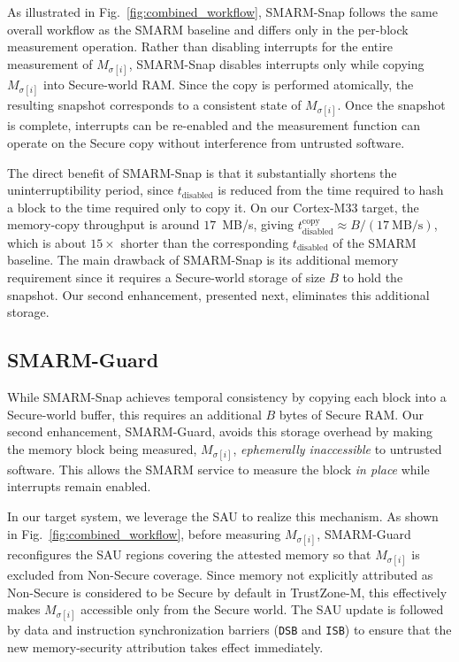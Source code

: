 \documentclass[conference]{IEEEtran}
\newcommand{\tdis}{$t_{\mathrm{disabled}}$\xspace}
\newcommand{\smarmcopy}{SMARM-Snap\xspace}
\newcommand{\smarmlock}{SMARM-Guard\xspace}
\begin{document}
As illustrated in Fig.~\ref{fig:combined_workflow}, \smarmcopy follows the same overall workflow as the SMARM baseline and differs only in the per-block measurement operation. Rather than disabling interrupts for the entire measurement of $M_{\sigma[i]}$, \smarmcopy disables interrupts only while copying $M_{\sigma[i]}$ into Secure-world RAM.
Since the copy is performed atomically, the resulting snapshot corresponds to a consistent state of $M_{\sigma[i]}$.
Once the snapshot is complete, interrupts can be re-enabled and the measurement function can operate on the Secure copy without interference from untrusted software.

The direct benefit of \smarmcopy is that it substantially shortens the uninterruptibility period, since \tdis is reduced from the time required to hash a block to the time required only to copy it. On our Cortex-M33 target, the memory-copy throughput is around $17$~MB/s, giving
$t_{\mathrm{disabled}}^{\mathrm{copy}}\approx B/(17~\mathrm{MB/s})$, which is about $15\times$ shorter than the corresponding \tdis of the SMARM baseline.
%
The main drawback of \smarmcopy is its additional memory requirement since it requires a Secure-world storage of size $B$ to hold the snapshot. Our second enhancement, presented next, eliminates this additional storage.



\subsection{\smarmlock}
\label{sec:sau}

While \smarmcopy achieves temporal consistency by copying each block into a Secure-world buffer, this requires an additional $B$ bytes of Secure RAM. Our second enhancement, \smarmlock, avoids this storage overhead by making the memory block being measured, $M_{\sigma[i]}$, \emph{ephemerally inaccessible} to untrusted software.
This allows the SMARM service to measure the block \emph{in place} while interrupts remain enabled.

In our target system, we leverage the SAU to realize this mechanism. As shown in Fig.~\ref{fig:combined_workflow}, before measuring $M_{\sigma[i]}$, \smarmlock reconfigures the SAU regions covering the attested memory so that $M_{\sigma[i]}$ is excluded from Non-Secure coverage.
Since memory not explicitly attributed as Non-Secure is considered to be Secure by default in TrustZone-M, this effectively makes $M_{\sigma[i]}$ accessible only from the Secure world. 
The SAU update is followed by data and instruction synchronization barriers (\texttt{DSB} and \texttt{ISB}) to ensure that the new memory-security attribution takes effect immediately.
\end{document}
